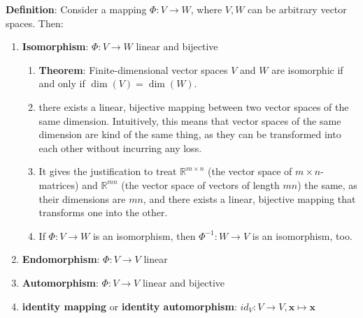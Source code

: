 \textbf{Definition}: Consider a mapping $\Phi : V \to W$, where $V, W$ can be arbitrary vector spaces. 
Then:
\hfill \cite{mfml/book/mml/Deisenroth-Faisal-Ong}

\begin{enumerate}
    \item \textbf{Isomorphism}: $\Phi : V \to W$ linear and bijective
    \hfill \cite{mfml/book/mml/Deisenroth-Faisal-Ong}
    \begin{enumerate}
        \item \textbf{Theorem}: Finite-dimensional vector spaces $V$ and $W$ are isomorphic if and only if $\dim(V ) = \dim(W)$.
        \hfill \cite{mfml/book/mml/Deisenroth-Faisal-Ong}

        \item there exists a linear, bijective mapping between two vector spaces of the same dimension.
        Intuitively, this means that vector spaces of the same dimension are kind of the same thing, as they can be transformed into each other without incurring any loss.
        \hfill \cite{mfml/book/mml/Deisenroth-Faisal-Ong}

        \item It gives the justification to treat $\mathbb{R}^{m\times n}$ (the vector space of $m \times n$-matrices) and $\mathbb{R}^{mn}$ (the vector space of vectors of length $mn$) the same, as their dimensions are $mn$, and there exists a linear, bijective mapping that transforms one into the other.
        \hfill \cite{mfml/book/mml/Deisenroth-Faisal-Ong}

        \item If $\Phi : V \to W$ is an isomorphism, then $\Phi ^{-1} : W \to V$ is an isomorphism, too.
        \hfill \cite{mfml/book/mml/Deisenroth-Faisal-Ong}
    \end{enumerate}

    \item \textbf{Endomorphism}: $\Phi : V \to V$ linear
    \hfill \cite{mfml/book/mml/Deisenroth-Faisal-Ong}

    \item \textbf{Automorphism}: $\Phi : V \to V$ linear and bijective
    \hfill \cite{mfml/book/mml/Deisenroth-Faisal-Ong}

    \item \textbf{identity mapping} or \textbf{identity automorphism}: $id_V : V \to V , \bm{x} \mapsto \bm{x}$
    \hfill \cite{mfml/book/mml/Deisenroth-Faisal-Ong}
\end{enumerate}



















